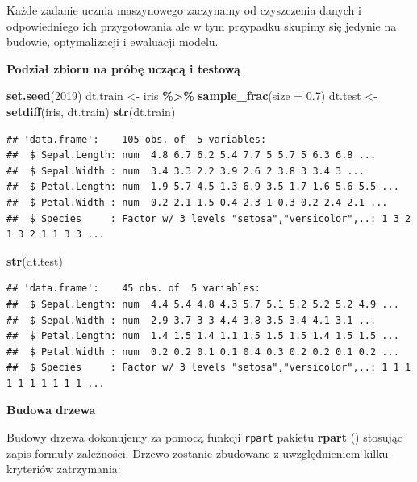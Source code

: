 \documentclass[
]{book}
\newenvironment{Shaded}{\begin{snugshade}}{\end{snugshade}}
\newcommand{\AttributeTok}[1]{\textcolor[rgb]{0.13,0.29,0.53}{#1}}
\newcommand{\DecValTok}[1]{\textcolor[rgb]{0.00,0.00,0.81}{#1}}
\newcommand{\FloatTok}[1]{\textcolor[rgb]{0.00,0.00,0.81}{#1}}
\newcommand{\FunctionTok}[1]{\textcolor[rgb]{0.13,0.29,0.53}{\textbf{#1}}}
\newcommand{\NormalTok}[1]{#1}
\newcommand{\OtherTok}[1]{\textcolor[rgb]{0.56,0.35,0.01}{#1}}
\newcommand{\SpecialCharTok}[1]{\textcolor[rgb]{0.81,0.36,0.00}{\textbf{#1}}}
\theoremstyle{plain}
\theoremstyle{definition}
\theoremstyle{definition}
\theoremstyle{definition}
\theoremstyle{definition}
\theoremstyle{definition}
\theoremstyle{remark}
\begin{document}
Każde zadanie ucznia maszynowego zaczynamy od czyszczenia danych i odpowiedniego ich przygotowania ale w tym przypadku skupimy się jedynie na budowie, optymalizacji i ewaluacji modelu.

\textbf{Podział zbioru na próbę uczącą i testową}

\begin{Shaded}
\begin{Highlighting}[]
\FunctionTok{set.seed}\NormalTok{(}\DecValTok{2019}\NormalTok{)}
\NormalTok{dt.train }\OtherTok{\textless{}{-}}\NormalTok{ iris }\SpecialCharTok{\%\textgreater{}\%} 
    \FunctionTok{sample\_frac}\NormalTok{(}\AttributeTok{size =} \FloatTok{0.7}\NormalTok{)}
\NormalTok{dt.test }\OtherTok{\textless{}{-}} \FunctionTok{setdiff}\NormalTok{(iris, dt.train)}
\FunctionTok{str}\NormalTok{(dt.train)}
\end{Highlighting}
\end{Shaded}

\begin{verbatim}
## 'data.frame':    105 obs. of  5 variables:
##  $ Sepal.Length: num  4.8 6.7 6.2 5.4 7.7 5 5.7 5 6.3 6.8 ...
##  $ Sepal.Width : num  3.4 3.3 2.2 3.9 2.6 2 3.8 3 3.4 3 ...
##  $ Petal.Length: num  1.9 5.7 4.5 1.3 6.9 3.5 1.7 1.6 5.6 5.5 ...
##  $ Petal.Width : num  0.2 2.1 1.5 0.4 2.3 1 0.3 0.2 2.4 2.1 ...
##  $ Species     : Factor w/ 3 levels "setosa","versicolor",..: 1 3 2 1 3 2 1 1 3 3 ...
\end{verbatim}

\begin{Shaded}
\begin{Highlighting}[]
\FunctionTok{str}\NormalTok{(dt.test)}
\end{Highlighting}
\end{Shaded}

\begin{verbatim}
## 'data.frame':    45 obs. of  5 variables:
##  $ Sepal.Length: num  4.4 5.4 4.8 4.3 5.7 5.1 5.2 5.2 5.2 4.9 ...
##  $ Sepal.Width : num  2.9 3.7 3 3 4.4 3.8 3.5 3.4 4.1 3.1 ...
##  $ Petal.Length: num  1.4 1.5 1.4 1.1 1.5 1.5 1.5 1.4 1.5 1.5 ...
##  $ Petal.Width : num  0.2 0.2 0.1 0.1 0.4 0.3 0.2 0.2 0.1 0.2 ...
##  $ Species     : Factor w/ 3 levels "setosa","versicolor",..: 1 1 1 1 1 1 1 1 1 1 ...
\end{verbatim}

\textbf{Budowa drzewa}

Budowy drzewa dokonujemy za pomocą funkcji \texttt{rpart} pakietu \textbf{rpart} () stosując zapis formuły zależności. Drzewo zostanie zbudowane z uwzględnieniem kilku kryteriów zatrzymania:
\end{document}
